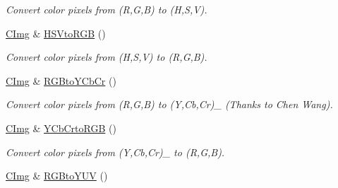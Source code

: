 \begin{DoxyCompactItemize}
\begin{DoxyCompactList}\small\item\em Convert color pixels from (R,G,B) to (H,S,V). \item\end{DoxyCompactList}\item 
\hypertarget{structcimg__library_1_1_c_img_a76049902fc796e72e197519fc5c58b8b}{
\hyperlink{structcimg__library_1_1_c_img}{CImg} \& \hyperlink{structcimg__library_1_1_c_img_a76049902fc796e72e197519fc5c58b8b}{HSVtoRGB} ()}
\label{structcimg__library_1_1_c_img_a76049902fc796e72e197519fc5c58b8b}

\begin{DoxyCompactList}\small\item\em Convert color pixels from (H,S,V) to (R,G,B). \item\end{DoxyCompactList}\item 
\hypertarget{structcimg__library_1_1_c_img_a40bf7f55f1a92f74d51db3b6c8b53e51}{
\hyperlink{structcimg__library_1_1_c_img}{CImg} \& \hyperlink{structcimg__library_1_1_c_img_a40bf7f55f1a92f74d51db3b6c8b53e51}{RGBtoYCbCr} ()}
\label{structcimg__library_1_1_c_img_a40bf7f55f1a92f74d51db3b6c8b53e51}

\begin{DoxyCompactList}\small\item\em Convert color pixels from (R,G,B) to (Y,Cb,Cr)\_ (Thanks to Chen Wang). \item\end{DoxyCompactList}\item 
\hypertarget{structcimg__library_1_1_c_img_ac17669d7f5b1cafff5fdf342632d08d3}{
\hyperlink{structcimg__library_1_1_c_img}{CImg} \& \hyperlink{structcimg__library_1_1_c_img_ac17669d7f5b1cafff5fdf342632d08d3}{YCbCrtoRGB} ()}
\label{structcimg__library_1_1_c_img_ac17669d7f5b1cafff5fdf342632d08d3}

\begin{DoxyCompactList}\small\item\em Convert color pixels from (Y,Cb,Cr)\_ to (R,G,B). \item\end{DoxyCompactList}\item 
\hypertarget{structcimg__library_1_1_c_img_ab45036f39a42c34a49618877abb4c9e7}{
\hyperlink{structcimg__library_1_1_c_img}{CImg} \& \hyperlink{structcimg__library_1_1_c_img_ab45036f39a42c34a49618877abb4c9e7}{RGBtoYUV} ()}
\label{structcimg__library_1_1_c_img_ab45036f39a42c34a49618877abb4c9e7}


\end{DoxyCompactItemize}
